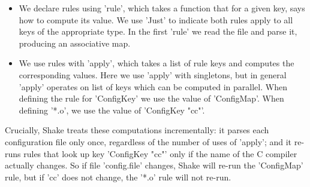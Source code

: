 \begin{itemize}
\item We declare rules using \lst'rule', which takes a function that for a given key,
says how to compute its value. We use \lst'Just' to indicate both rules apply to all
keys of the appropriate type. In the first \lst'rule' we read the file and parse it,
producing an associative map.
\item We use rules with \lst'apply', which takes a list of rule keys and computes the
corresponding values. Here we use \lst'apply' with singletons, but in general \lst'apply'
operates on list of keys which can be computed in parallel. When defining the rule
for \lst'ConfigKey' we use the value of \lst'ConfigMap'. When defining \lst'*.o',
we use the value of \lst'ConfigKey "cc"'.
\end{itemize}

Crucially, Shake treats these computations incrementally: it parses each
configuration file only once, regardless of the number of uses of \lst'apply'; and
it re-runs rules that look up key \lst'ConfigKey "cc"' only if the
name of the C compiler actually changes.  So if file \lst'config.file' changes,
Shake will re-run the \lst'ConfigMap' rule, but if \lst'cc' does
not change, the \lst'*.o' rule will not re-run.

% 

